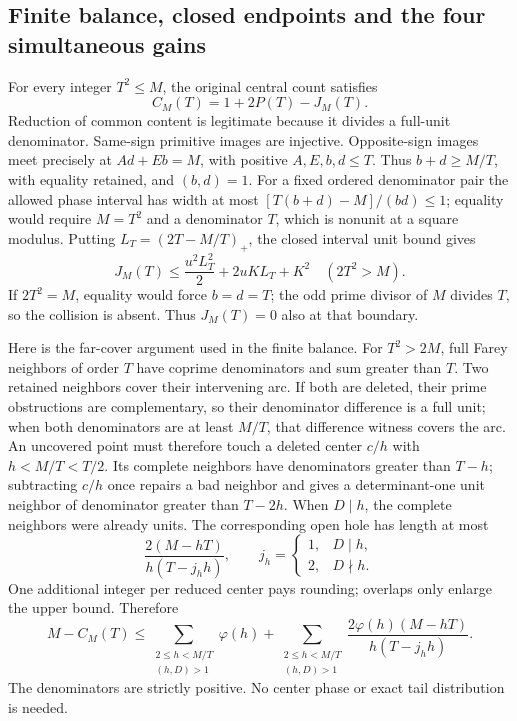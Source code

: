 \documentclass[11pt]{article}
\theoremstyle{definition}\newtheorem{definition}[theorem]{Definition}
\theoremstyle{remark}\newtheorem{remark}[theorem]{Remark}
\begin{document}
\subsection{Finite balance, closed endpoints and the four simultaneous gains}
\label{ap:finite:five-bounds}

For every integer \(T^2\le M\), the original central count satisfies
\[
 C_M(T)=1+2P(T)-J_M(T).
\]
Reduction of common content is legitimate because it divides a full-unit
denominator.  Same-sign primitive images are injective.  Opposite-sign
images meet precisely at \(Ad+Eb=M\), with positive \(A,E,b,d\le T\).
Thus \(b+d\ge M/T\), with equality retained, and \((b,d)=1\).
For a fixed ordered denominator pair the allowed phase interval has width
at most \([T(b+d)-M]/(bd)\le1\); equality would require \(M=T^2\) and
a denominator \(T\), which is nonunit at a square modulus.
Putting \(L_T=(2T-M/T)_+\), the closed interval unit bound gives
\[
 J_M(T)\le\frac{u^2L_T^2}{2}+2uKL_T+K^2\quad(2T^2>M).
\]
If \(2T^2=M\), equality would force \(b=d=T\); the odd prime divisor
of \(M\) divides \(T\), so the collision is absent.  Thus \(J_M(T)=0\)
also at that boundary.

Here is the far-cover argument used in the finite balance.
For \(T^2>2M\), full Farey neighbors of order \(T\) have coprime
denominators and sum greater than \(T\).  Two retained neighbors cover
their intervening arc.  If both are deleted, their prime obstructions
are complementary, so their denominator difference is a full unit;
when both denominators are at least \(M/T\), that difference witness
covers the arc.  An uncovered point must therefore touch a deleted
center \(c/h\) with \(h<M/T<T/2\).
Its complete neighbors have denominators greater than \(T-h\);
subtracting \(c/h\) once repairs a bad neighbor and gives a determinant-one
unit neighbor of denominator greater than \(T-2h\).  When \(D\mid h\),
the complete neighbors were already units.  The corresponding open
hole has length at most
\[
 \frac{2(M-hT)}{h(T-j_hh)},\qquad
 j_h=\begin{cases}1,&D\mid h,\\2,&D\nmid h.\end{cases}
\]
One additional integer per reduced center pays rounding; overlaps only
enlarge the upper bound.  Therefore
\begin{equation}
 M-C_M(T)\le
 \sum_{\substack{2\le h<M/T\\(h,D)>1}}\varphi(h)+
 \sum_{\substack{2\le h<M/T\\(h,D)>1}}
       \frac{2\varphi(h)(M-hT)}{h(T-j_hh)} .
 \label{eq:finite:far-cover}
\end{equation}
The denominators are strictly positive.  No center phase or exact tail
distribution is needed.
\end{document}
